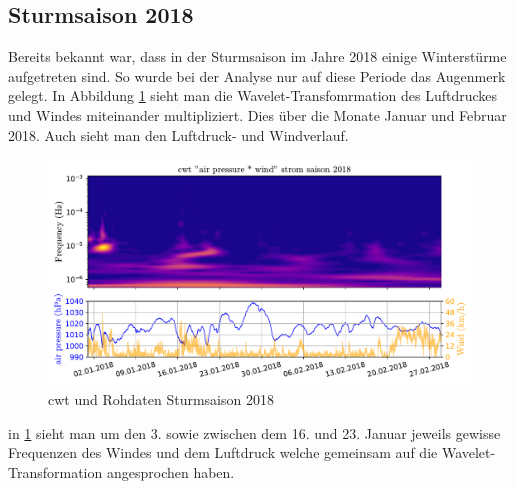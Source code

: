 \begin{refsection}
\subsection{Sturmsaison 2018}
Bereits bekannt war, dass in der Sturmsaison im Jahre 2018 einige Winterstürme aufgetreten sind.
So wurde bei der Analyse nur auf diese Periode das Augenmerk gelegt. In Abbildung \ref{fig:cwt_storm} \space sieht man die Wavelet-Transfomrmation des Luftdruckes und Windes miteinander multipliziert. Dies über die Monate Januar und Februar 2018. Auch sieht man den Luftdruck- und Windverlauf.
 
\begin{figure}[h]
	\centering
	\includegraphics[width=1\textwidth]{papers/wwt/images/storm_airp_wind.pdf}
	\caption{cwt und Rohdaten Sturmsaison 2018}
	\label{fig:cwt_storm}
\end{figure}

in \ref{fig:cwt_storm} \space sieht man um den 3. sowie zwischen dem 16. und 23. Januar jeweils gewisse Frequenzen des Windes und dem Luftdruck welche gemeinsam auf die Wavelet-Transformation angesprochen haben.


\end{refsection}
